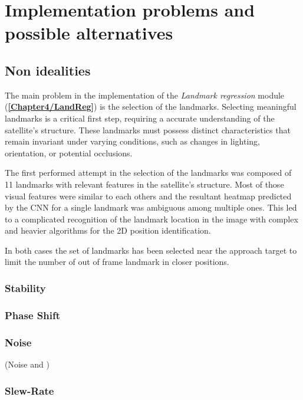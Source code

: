 \section{Implementation problems and possible alternatives}

\subsection{Non idealities}
\label{Chapter4/LandmarksSel}
The main problem in the implementation of the \textit{Landmark regression} module (\textbf{\ref{Chapter4/LandReg}}) is the selection of the landmarks.
Selecting meaningful landmarks is a critical first step, requiring a accurate understanding of the satellite's structure. These landmarks must possess distinct characteristics that remain invariant under varying conditions, such as changes in lighting, orientation, or potential occlusions.

The first performed attempt in the selection of the landmarks was composed of 11 landmarks with relevant features in the satellite's structure. Most of those visual features were similar to each others and the resultant heatmap predicted by the CNN for a single landmark was ambiguous among multiple ones. This led to a complicated recognition of the landmark location in the image with complex and heavier algorithms for the 2D position identification.

In both cases the set of landmarks has been selected near the approach target to limit the number of out of frame landmark in closer positions.

\subsubsection{Stability}

\subsubsection{Phase Shift}

\subsubsection{Noise}
(Noise and )

\subsubsection{Slew-Rate}

